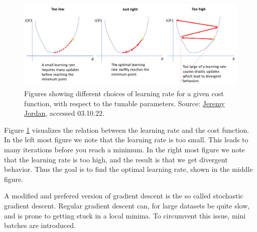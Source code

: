 \begin{figure}[H]
    \includegraphics[width=\linewidth]{Figures/Machinelearning/lr_choice.png}
    \caption[Explaining concequence of choice of learning rate]{Figures showing different choices of learning rate for a given cost function, with respect to the tunable parameters. 
    Source: \href{https://www.jeremyjordan.me/content/images/2018/02/Screen-Shot-2018-02-24-at-11.47.09-AM.png}{Jeremy Jordan}, accessed 03.10.22.}
    \label{fig:lr_choice}
\end{figure}

Figure \ref{fig:lr_choice} visualizes the relation between the learning rate and the cost function. In the left most figure we note that the learning rate is too small. 
This leads to many iterations before you reach a minimum. In the right most figure we note that the learning rate is too high, and the result is that we get divergent behavior. 
Thus the goal is to find the optimal learning rate, shown in the middle figure. \par 
A modified and prefered version of gradient descent is the so called stochastic gradient descent. Regular gradient descent can, for large datasets be quite slow, and is prone to 
getting stuck in a local minima. To circumvent this issue, mini batches are introduced. 




